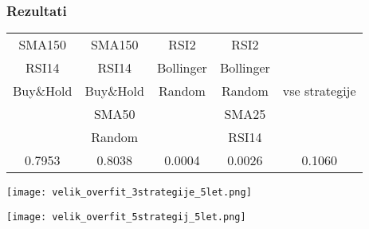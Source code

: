 \documentclass{beamer}
\begin{document}

\begin{frame}
\frametitle{Rezultati}
\begin{tabular}{|c|c|c|c|c|}
\hline
SMA150 & SMA150 & RSI2 & RSI2 & \multirow{5}{*}{vse strategije} \\
RSI14 & RSI14 & Bollinger & Bollinger & \\
Buy\&Hold &  Buy\&Hold  & Random & Random & \\
& SMA50 & & SMA25 & \\
 & Random &   & RSI14 &  \\
\hline
 0.7953 & 0.8038 & 0.0004 & 0.0026 & 0.1060 \\
 \hline
\end{tabular}
\end{frame}



\begin{frame}
\texttt{[image: velik\_overfit\_3strategije\_5let.png]}
\end{frame}

\begin{frame}
\texttt{[image: velik\_overfit\_5strategij\_5let.png]}
\end{frame}
\end{document}
